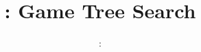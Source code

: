 \usepackage{../../beamerthemeFalmouthGamesAcademy}
\usepackage{multimedia}
\graphicspath{ {../../} }

\usepackage[T1]{fontenc}

\renewcommand{\pounds}{\text{\textsterling}}


\usepackage[normalem]{ulem}
\usepackage{wasysym}

\usepackage[noend]{algpseudocode}
\usepackage{pdfpages}

\usetikzlibrary{arrows,automata}




\title{\sessionnumber: Game Tree Search}
\subtitle{\modulecode: \moduletitle}

\frame{\titlepage} 








